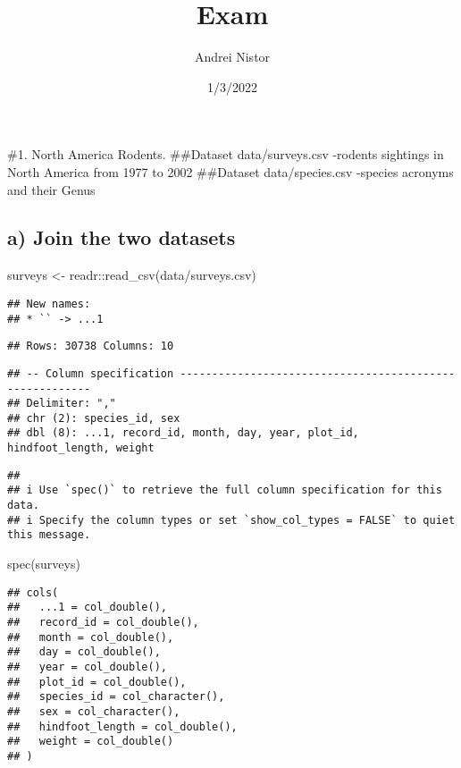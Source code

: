 \documentclass[
]{article}
\title{Exam}
\author{Andrei Nistor}
\date{1/3/2022}
\newenvironment{Shaded}{\begin{snugshade}}{\end{snugshade}}
\newcommand{\FunctionTok}[1]{\textcolor[rgb]{0.00,0.00,0.00}{#1}}
\newcommand{\NormalTok}[1]{#1}
\newcommand{\OtherTok}[1]{\textcolor[rgb]{0.56,0.35,0.01}{#1}}
\newcommand{\SpecialCharTok}[1]{\textcolor[rgb]{0.00,0.00,0.00}{#1}}
\newcommand{\StringTok}[1]{\textcolor[rgb]{0.31,0.60,0.02}{#1}}
\begin{document}
\maketitle

\#1. North America Rodents. \#\#Dataset data/surveys.csv -rodents
sightings in North America from 1977 to 2002 \#\#Dataset
data/species.csv -species acronyms and their Genus

\hypertarget{a-join-the-two-datasets}{%
\subsection{a) Join the two datasets}\label{a-join-the-two-datasets}}

\begin{Shaded}
\begin{Highlighting}[]
\NormalTok{surveys }\OtherTok{\textless{}{-}}\NormalTok{ readr}\SpecialCharTok{::}\FunctionTok{read\_csv}\NormalTok{(}\StringTok{\textquotesingle{}data/surveys.csv\textquotesingle{}}\NormalTok{)}
\end{Highlighting}
\end{Shaded}

\begin{verbatim}
## New names:
## * `` -> ...1
\end{verbatim}

\begin{verbatim}
## Rows: 30738 Columns: 10
\end{verbatim}

\begin{verbatim}
## -- Column specification --------------------------------------------------------
## Delimiter: ","
## chr (2): species_id, sex
## dbl (8): ...1, record_id, month, day, year, plot_id, hindfoot_length, weight
\end{verbatim}

\begin{verbatim}
## 
## i Use `spec()` to retrieve the full column specification for this data.
## i Specify the column types or set `show_col_types = FALSE` to quiet this message.
\end{verbatim}

\begin{Shaded}
\begin{Highlighting}[]
\FunctionTok{spec}\NormalTok{(surveys)}
\end{Highlighting}
\end{Shaded}

\begin{verbatim}
## cols(
##   ...1 = col_double(),
##   record_id = col_double(),
##   month = col_double(),
##   day = col_double(),
##   year = col_double(),
##   plot_id = col_double(),
##   species_id = col_character(),
##   sex = col_character(),
##   hindfoot_length = col_double(),
##   weight = col_double()
## )
\end{verbatim}
\end{document}

